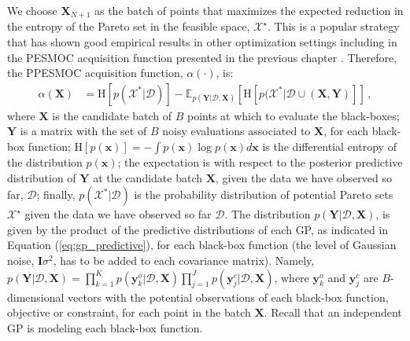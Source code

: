 We choose $\mathbf{X}_{N+1}$ as the batch of points that maximizes the expected reduction
in the entropy of the Pareto set in the feasible space, $\mathcal{X}^\star$.  This is a popular strategy 
that has shown good empirical results in other optimization settings including in the PESMOC acquisition function presented in the previous chapter \citep{hernandez2014predictive,hernandez2016predictive,garrido2019predictive,shah2015parallel}.
Therefore, the PPESMOC acquisition function, $\alpha(\cdot)$, is:
\begin{align}
\alpha(\mathbf{X}) & = \text{H}[p(\mathcal{X}^*|\mathcal{D})] - 
\mathbb{E}_{p(\mathbf{Y}|\mathcal{D},\mathbf{X})}[\text{H}[p(\mathcal{X}^*|\mathcal{D} \cup (\mathbf{X},\mathbf{Y})]]\,,
	\label{eq:initial_acq}
\end{align}
where $\mathbf{X}$ is the candidate batch of $B$ points at which to evaluate the black-boxes;
$\mathbf{Y}$ is a matrix with the set of $B$ noisy evaluations associated to $\mathbf{X}$, for each black-box function; 
$\text{H}[p(\mathbf{x})] = - \int p(\mathbf{x}) \log p(\mathbf{x})d\mathbf{x}$ is the differential entropy of 
the distribution $p(\mathbf{x})$; the expectation is with respect to the posterior predictive 
distribution of $\mathbf{Y}$ at the candidate batch $\mathbf{X}$, given the data we have observed so far, $\mathcal{D}$; 
finally, $p(\mathcal{X}^*|\mathcal{D})$ is the probability distribution of potential Pareto sets $\mathcal{X}^\star$ 
given the data we have observed so far $\mathcal{D}$.
The distribution $p(\mathbf{Y}|\mathcal{D},\mathbf{X})$, is given by the product of the predictive
distributions of each GP, as indicated in Equation (\ref{eq:gp_predictive}), 
for each black-box function (the level of Gaussian noise, $\mathbf{I}\sigma^2$, has to be added to each covariance matrix).  
Namely, $p(\mathbf{Y}|\mathcal{D},\mathbf{X})=\prod_{k=1}^K p(\mathbf{y}_k^o|\mathcal{D},\mathbf{X})
\prod_{j=1}^J p(\mathbf{y}_j^c|\mathcal{D},\mathbf{X})$, where $\mathbf{y}_k^o$ and $\mathbf{y}_j^c$ are $B$-dimensional
vectors with the potential observations of each black-box function, objective or constraint, for each point in the 
batch $\mathbf{X}$. Recall that an independent GP is modeling each black-box function. 

